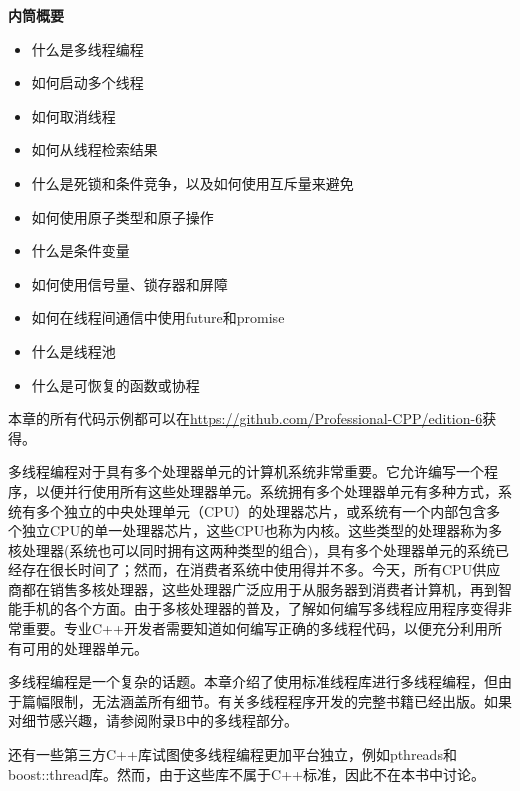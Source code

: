 \noindent
\textbf{内筒概要}

\begin{itemize}
\item
什么是多线程编程

\item
如何启动多个线程

\item
如何取消线程

\item
如何从线程检索结果

\item
什么是死锁和条件竞争，以及如何使用互斥量来避免

\item
如何使用原子类型和原子操作

\item
什么是条件变量

\item
如何使用信号量、锁存器和屏障

\item
如何在线程间通信中使用future和promise

\item
什么是线程池

\item
什么是可恢复的函数或协程
\end{itemize}

本章的所有代码示例都可以在\url{https://github.com/Professional-CPP/edition-6}获得。

多线程编程对于具有多个处理器单元的计算机系统非常重要。它允许编写一个程序，以便并行使用所有这些处理器单元。系统拥有多个处理器单元有多种方式，系统有多个独立的中央处理单元（CPU）的处理器芯片，或系统有一个内部包含多个独立CPU的单一处理器芯片，这些CPU也称为内核。这些类型的处理器称为多核处理器(系统也可以同时拥有这两种类型的组合)，具有多个处理器单元的系统已经存在很长时间了；然而，在消费者系统中使用得并不多。今天，所有CPU供应商都在销售多核处理器，这些处理器广泛应用于从服务器到消费者计算机，再到智能手机的各个方面。由于多核处理器的普及，了解如何编写多线程应用程序变得非常重要。专业C++开发者需要知道如何编写正确的多线程代码，以便充分利用所有可用的处理器单元。

多线程编程是一个复杂的话题。本章介绍了使用标准线程库进行多线程编程，但由于篇幅限制，无法涵盖所有细节。有关多线程程序开发的完整书籍已经出版。如果对细节感兴趣，请参阅附录B中的多线程部分。

还有一些第三方C++库试图使多线程编程更加平台独立，例如pthreads和boost::thread库。然而，由于这些库不属于C++标准，因此不在本书中讨论。






